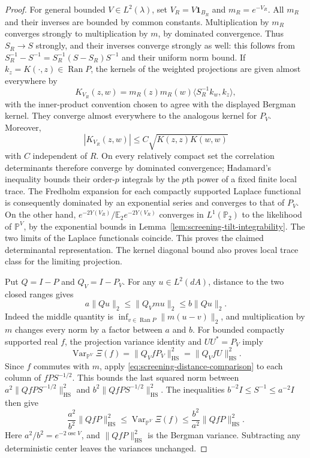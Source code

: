 \documentclass[11pt,a4paper]{article}
\numberwithin{equation}{section}
\theoremstyle{definition}
\theoremstyle{remark}
\begin{document}
\begin{proof}
For general bounded $V\in L^2(\lambda)$, set
$V_R=V\mathbf1_{B_R}$ and $m_R=e^{-V_R}$.  All $m_R$ and their
inverses are bounded by common constants.  Multiplication by $m_R$
converges strongly to multiplication by $m$, by dominated
convergence.  Thus $S_R\to S$ strongly, and their inverses converge
strongly as well: this follows from
$S_R^{-1}-S^{-1}=S_R^{-1}(S-S_R)S^{-1}$ and their uniform norm bound.
If $k_z=K(\cdot,z)\in\operatorname{Ran}P$, the kernels of the
weighted projections are given almost everywhere by
\[
 K_{V_R}(z,w)=m_R(z)m_R(w)
       \langle S_R^{-1}k_w,k_z\rangle,
\]
with the inner-product convention chosen to agree with the displayed
Bergman kernel.  They converge almost everywhere to the analogous
kernel for $P_V$.  Moreover,
\[
 |K_{V_R}(z,w)|\le C
                \sqrt{K(z,z)K(w,w)}
\]
with $C$ independent of $R$.  On every relatively compact set the
correlation determinants therefore converge by dominated convergence;
Hadamard's inequality bounds their order-$p$ integrals by the $p$th
power of a fixed finite local trace.  The Fredholm expansion for each
compactly supported Laplace functional is consequently dominated by
an exponential series and converges to that of $P_V$.
On the other hand,
$e^{-2Y(V_R)}/\mathbb E_2 e^{-2Y(V_R)}$ converges in
$L^1(\mathbb P_2)$ to the likelihood of $\mathbb P^V$, by the
exponential bounds in Lemma~\ref{lem:screening-tilt-integrability}.
The two limits of the Laplace functionals coincide.  This proves the
claimed determinantal representation.  The kernel diagonal bound
also proves local trace class for the limiting projection.

Put $Q=I-P$ and $Q_V=I-P_V$.  For any $u\in L^2(dA)$, distance
to the two closed ranges gives
\begin{equation}
 a\|Qu\|_2\le \|Q_Vmu\|_2\le b\|Qu\|_2.
 \label{eq:screening-distance-comparison}
\end{equation}
Indeed the middle quantity is
$\inf_{v\in\operatorname{Ran}P}\|m(u-v)\|_2$, and multiplication
by $m$ changes every norm by a factor between $a$ and $b$.
For bounded compactly supported real $f$, the projection
variance identity and $UU^*=P_V$ imply
\[
 \operatorname{Var}_{\mathbb P^V}\Xi(f)
 =\|Q_V fP_V\|_{\mathrm{HS}}^2
 =\|Q_V fU\|_{\mathrm{HS}}^2.
\]
Since $f$ commutes with $m$, apply
\eqref{eq:screening-distance-comparison} to each column of
$fP S^{-1/2}$.  This bounds the last squared norm between
$a^2\|QfP S^{-1/2}\|_{\mathrm{HS}}^2$ and
$b^2\|QfP S^{-1/2}\|_{\mathrm{HS}}^2$.
The inequalities $b^{-2}I\le S^{-1}\le a^{-2}I$ then give
\[
 \frac{a^2}{b^2}\|QfP\|_{\mathrm{HS}}^2
 \le\operatorname{Var}_{\mathbb P^V}\Xi(f)
 \le\frac{b^2}{a^2}\|QfP\|_{\mathrm{HS}}^2.
\]
Here $a^2/b^2=e^{-2\operatorname{osc}V}$, and
$\|QfP\|_{\mathrm{HS}}^2$ is the Bergman variance.  Subtracting
any deterministic center leaves the variances unchanged.


\end{proof}
\end{document}

